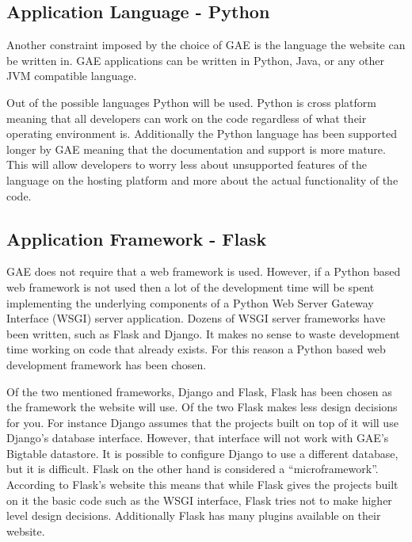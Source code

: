 \documentclass{article}
\begin{document}
\subsection{Application Language - Python}

Another constraint imposed by the choice of GAE is the language the website can be written in. GAE applications can
be written in Python, Java, or any other JVM compatible language. \cite{google_google_2012}

Out of the possible languages Python will be used. Python is cross platform meaning that all developers can
work on the code regardless of what their operating environment is. Additionally the Python language has been supported
longer by GAE meaning that the documentation and support is more mature. This will allow developers to worry less about
unsupported features of the language on the hosting platform and more about the actual functionality of the code.

\subsection{Application Framework - Flask}

GAE does not require that a web framework is used. However, if a Python based web framework is not used then a lot of
the development time will be spent implementing the underlying components of a Python Web Server Gateway Interface (WSGI) server application. \cite{wsgi.org_what_2012} Dozens of WSGI server frameworks have been written, such as Flask and Django. \cite{_flask_2010} \cite{_django_2012} It makes no sense to waste development time working on code that already exists. For this reason a Python based web development framework has been chosen.

Of the two mentioned frameworks, Django and Flask, Flask has been chosen as the framework the website will use. Of
the two Flask makes less design decisions for you. For instance Django assumes that the projects built on top of it will
use Django's database interface. However, that interface will not work with GAE's Bigtable datastore. It is possible to configure Django to use a different database, but it is difficult. Flask on the other hand is considered a ``microframework''.
According to Flask's website this means that while Flask gives the projects built on it the basic code such as the WSGI 
interface, Flask tries not to make higher level design decisions. Additionally Flask has many plugins available on
their website. \cite{extensions_flask_2012}
\end{document}
